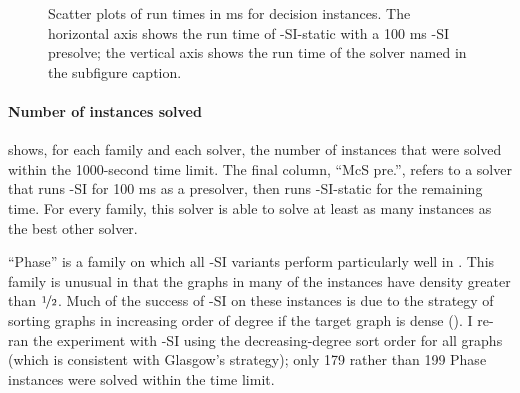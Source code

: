\begin{figure}[htb]
{    }
    \caption{Scatter plots of run times in ms for decision instances.
            The horizontal axis shows the run time of \McSplit-SI-static
            with a 100 ms \McSplit-SI presolve; the vertical axis shows
            the run time of the solver named in the subfigure caption.}
    \label{figure:presolve-scatter}
\end{figure}

\paragraph*{Number of instances solved}
 shows, for each family and each solver,
the number of instances that were solved within the 1000-second time limit.
The final column, ``McS pre.'', refers to a solver that runs \McSplit-SI for 100 ms
as a presolver, then runs \McSplit-SI-static for the remaining time.  For every
family, this solver is able to solve at least as many instances as the best other
solver.

``Phase'' is a family on which all \McSplit-SI variants perform particularly well in
.  This family is unusual in that the graphs
in many of the instances have density greater than $\nicefrac{1}{2}$.  
Much of the success of \McSplit-SI on these instances is due to the
strategy of sorting graphs in increasing order of degree if the target
graph is dense ().  I re-ran the experiment 
with \McSplit-SI using the decreasing-degree sort order for all graphs
(which is consistent with Glasgow's strategy);
only 179 rather than 199 Phase instances were solved within the time limit.

